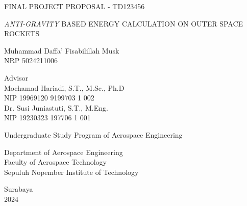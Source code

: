 \begin{large}
  FINAL PROJECT PROPOSAL - TD123456
\end{large}

\vspace{\fill}

\begin{spacing}{1.5}
  \begin{Large}
    \emph{ANTI-GRAVITY} BASED ENERGY CALCULATION ON OUTER SPACE ROCKETS
  \end{Large}
\end{spacing}

\vspace{\fill}

\begin{large}
  Muhammad Daffa' Fisabilillah Musk \\
  \textmd{NRP 5024211006}
\end{large}

\vspace{\fill}

\begin{large}
  \textmd{Advisor} \\
  Mochamad Hariadi, S.T., M.Sc., Ph.D \\
  \textmd{NIP 19969120 9199703 1 002} \\
  Dr. Susi Juniastuti, S.T., M.Eng. \\
  \textmd{NIP 19230323 197706 1 001}
\end{large}

\vspace{\fill}

Undergraduate Study Program of Aerospace Engineering \\

\mdseries

Department of Aerospace Engineering \\
Faculty of Aerospace Technology \\
Sepuluh Nopember Institute of Technology

Surabaya \\
2024

